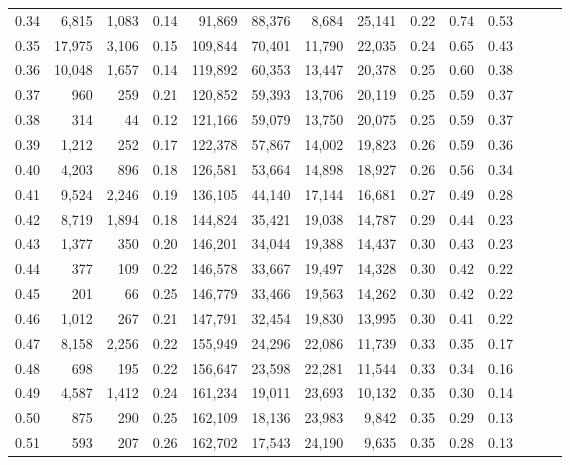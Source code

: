 \begin{tabular}{rrrrrrrrrrrrrr}
0.34 &   6,815 &  1,083 &  0.14 &   91,869 &   88,376 &   8,684 &  25,141 &  0.22 &  0.74 &      0.53 \\
0.35 &  17,975 &  3,106 &  0.15 &  109,844 &   70,401 &  11,790 &  22,035 &  0.24 &  0.65 &      0.43 \\
0.36 &  10,048 &  1,657 &  0.14 &  119,892 &   60,353 &  13,447 &  20,378 &  0.25 &  0.60 &      0.38 \\
0.37 &     960 &    259 &  0.21 &  120,852 &   59,393 &  13,706 &  20,119 &  0.25 &  0.59 &      0.37 \\
0.38 &     314 &     44 &  0.12 &  121,166 &   59,079 &  13,750 &  20,075 &  0.25 &  0.59 &      0.37 \\
0.39 &   1,212 &    252 &  0.17 &  122,378 &   57,867 &  14,002 &  19,823 &  0.26 &  0.59 &      0.36 \\
0.40 &   4,203 &    896 &  0.18 &  126,581 &   53,664 &  14,898 &  18,927 &  0.26 &  0.56 &      0.34 \\
0.41 &   9,524 &  2,246 &  0.19 &  136,105 &   44,140 &  17,144 &  16,681 &  0.27 &  0.49 &      0.28 \\
0.42 &   8,719 &  1,894 &  0.18 &  144,824 &   35,421 &  19,038 &  14,787 &  0.29 &  0.44 &      0.23 \\
0.43 &   1,377 &    350 &  0.20 &  146,201 &   34,044 &  19,388 &  14,437 &  0.30 &  0.43 &      0.23 \\
0.44 &     377 &    109 &  0.22 &  146,578 &   33,667 &  19,497 &  14,328 &  0.30 &  0.42 &      0.22 \\
0.45 &     201 &     66 &  0.25 &  146,779 &   33,466 &  19,563 &  14,262 &  0.30 &  0.42 &      0.22 \\
0.46 &   1,012 &    267 &  0.21 &  147,791 &   32,454 &  19,830 &  13,995 &  0.30 &  0.41 &      0.22 \\
0.47 &   8,158 &  2,256 &  0.22 &  155,949 &   24,296 &  22,086 &  11,739 &  0.33 &  0.35 &      0.17 \\
0.48 &     698 &    195 &  0.22 &  156,647 &   23,598 &  22,281 &  11,544 &  0.33 &  0.34 &      0.16 \\
0.49 &   4,587 &  1,412 &  0.24 &  161,234 &   19,011 &  23,693 &  10,132 &  0.35 &  0.30 &      0.14 \\
0.50 &     875 &    290 &  0.25 &  162,109 &   18,136 &  23,983 &   9,842 &  0.35 &  0.29 &      0.13 \\
0.51 &     593 &    207 &  0.26 &  162,702 &   17,543 &  24,190 &   9,635 &  0.35 &  0.28 &      0.13 \\

\end{tabular}
